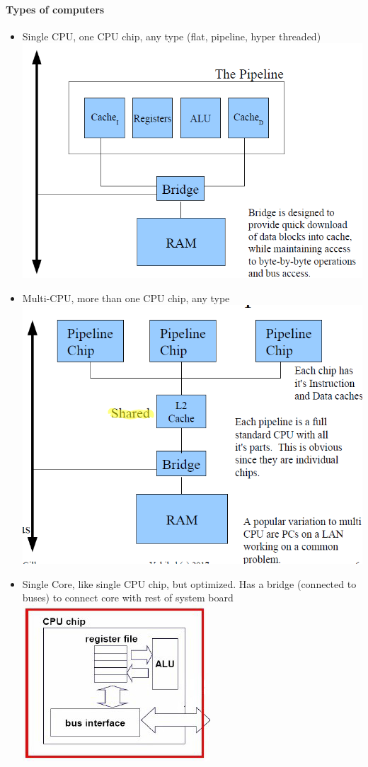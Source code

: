 \documentclass[12 pt]{article}
\begin{document}
\paragraph{Types of computers}
\begin{itemize}
\item Single CPU, one CPU chip, any type (flat, pipeline, hyper threaded)
\\ \includegraphics[scale=0.7]{sc}
\item Multi-CPU, more than one CPU chip, any type
\\ \includegraphics[scale=0.7]{mcc}
\item Single Core, like single CPU chip, but optimized. Has a bridge (connected to buses) to connect core with rest of system board
\\ \includegraphics{scc}

\end{itemize}
\end{document}
